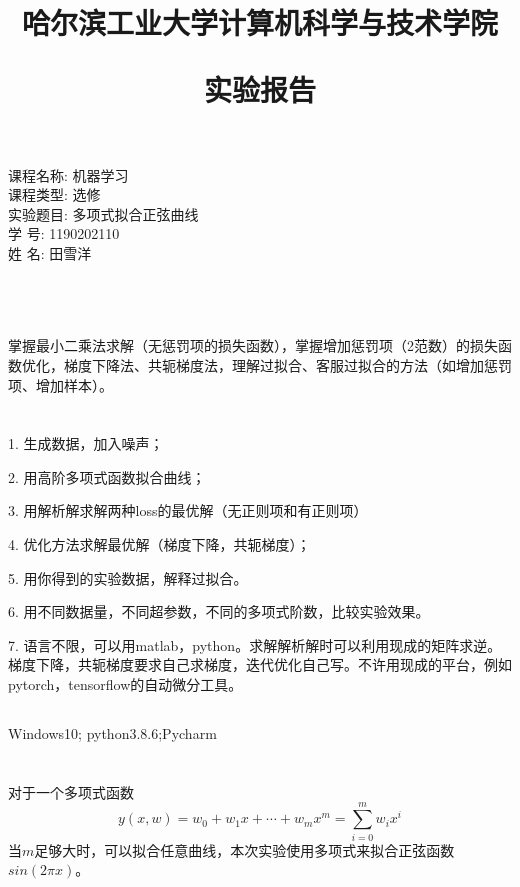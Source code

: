 \documentclass[lang=cn,a4paper,cite=authoryear]{elegantpaper}
\title{\zihao{1}哈尔滨工业大学计算机科学与技术学院 \par 实验报告}
\date{}
\begin{document}
\maketitle
\thispagestyle{empty}
\begin{center}
   	{ 课程名称:  机器学习}\\[.5cm]
    { 课程类型:   选修}\\[.5cm]
    { 实验题目:  多项式拟合正弦曲线}\\[.5cm]
	{ 学 号:  1190202110}\\[.5cm]
	{ 姓 名: 田雪洋}\\[.5cm]
    { \date{\zhtoday}}\\[.50cm]
\end{center}


\newpage
{}
\section*{}
掌握最小二乘法求解（无惩罚项的损失函数），掌握增加惩罚项（2范数）的损失函数优化，梯度下降法、共轭梯度法，理解过拟合、客服过拟合的方法（如增加惩罚项、增加样本）。

\section*{}
\subsection*{}
1. 生成数据，加入噪声；
\par 2. 用高阶多项式函数拟合曲线；
\par 3. 用解析解求解两种loss的最优解（无正则项和有正则项）
\par 4. 优化方法求解最优解（梯度下降，共轭梯度）；
\par 5. 用你得到的实验数据，解释过拟合。
\par 6. 用不同数据量，不同超参数，不同的多项式阶数，比较实验效果。
\par 7. 语言不限，可以用matlab，python。求解解析解时可以利用现成的矩阵求逆。梯度下降，共轭梯度要求自己求梯度，迭代优化自己写。不许用现成的平台，例如pytorch，tensorflow的自动微分工具。

\subsection*{}
Windows10; python3.8.6;Pycharm 
\section*{}
对于一个多项式函数
\begin{equation}
	y(x, w)=w_{0}+w_{1} x+\cdots+w_{m} x^{m}=\sum_{i=0}^{m} w_{i} x^{i}
\end{equation}
当$m$足够大时，可以拟合任意曲线，本次实验使用多项式来拟合正弦函数 $sin(2\pi x)$。
\end{document}
